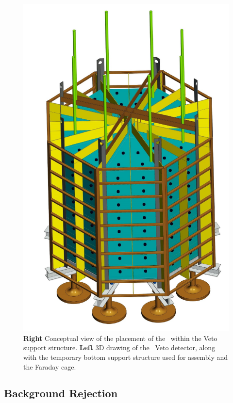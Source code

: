 \begin{figure}[!t]
\includegraphics[height=0.75\textheight]{./Figures/Veto-Faraday.pdf}
\caption[3D drawings of the \DSks\ Veto detector.]{{\bf Right} Conceptual view of the placement of the \TPC\ within the Veto support structure. {\bf Left} 3D drawing of the \DSks\ Veto detector, along with the temporary bottom support structure used for assembly and the Faraday cage.}
\label{fig:VetoAssembly}
\end{figure}

\subsection{Background Rejection}

